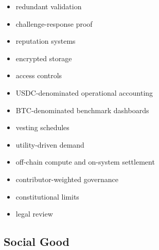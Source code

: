 ﻿\documentclass[12pt]{article}
\begin{document}
\begin{itemize}
  \item redundant validation
\end{itemize}
\begin{itemize}
  \item challenge-response proof
\end{itemize}
\begin{itemize}
  \item reputation systems
\end{itemize}
\begin{itemize}
  \item encrypted storage
\end{itemize}
\begin{itemize}
  \item access controls
\end{itemize}
\begin{itemize}
  \item USDC-denominated operational accounting
\end{itemize}
\begin{itemize}
  \item BTC-denominated benchmark dashboards
\end{itemize}
\begin{itemize}
  \item vesting schedules
\end{itemize}
\begin{itemize}
  \item utility-driven demand
\end{itemize}
\begin{itemize}
  \item off-chain compute and on-system settlement
\end{itemize}
\begin{itemize}
  \item contributor-weighted governance
\end{itemize}
\begin{itemize}
  \item constitutional limits
\end{itemize}
\begin{itemize}
  \item legal review
\end{itemize}

\subsection{Social Good}
\end{document}
